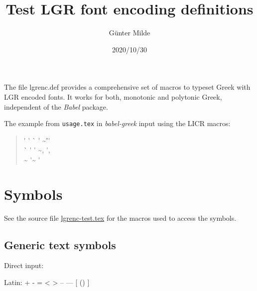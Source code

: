 \documentclass{article}
\newcommand{\LGR}{\fontencoding{LGR}\selectfont}
\begin{document}
\title{Test LGR font encoding definitions}
\author{Günter Milde}
\date{2020/10/30}
\maketitle

The file lgrenc.def provides a comprehensive set of macros to typeset Greek
with LGR encoded fonts. It works for both, monotonic and polytonic Greek,
independent of the \emph{Babel} package.

The example from \texttt{usage.tex} in \emph{babel-greek} input
using the LICR macros:

\begin{quote}
  \LGR
  \textTau\'\textiota{}
  \textphi\'\texteta\textiota\textfinalsigma\texterotimatiko{}
  \<\textIota\textdelta\`\textomega\textnu{}
  \>\textepsilon\textnu\texttheta\'\textepsilon\textdelta\textepsilon{}
  \textpi\textalpha\~\textiota\textdelta\'\'
  \>\textepsilon\textlambda\textepsilon\textupsilon\texttheta\'\textepsilon\textrho\textalpha\textnu\\
  \texttau\`\textalpha\textfinalsigma{}
  \textpi\textlambda\texteta\textautosigma\'\textiota\textomicron\textnu{}
  \textNu\'\textupsilon\textmu\textphi\textalpha\textfinalsigma{}
  \textautosigma\texttau\textepsilon\textphi\textalpha\textnu\textomicron\~\textupsilon\textautosigma\textalpha\textnu{},
  \textSigma\'\textomega\textautosigma\texttau\textrho\textalpha\texttau\textepsilon{},\\
  \>\textepsilon\textrho\~\textomega\textnu{}
  \'\textalpha\textpi\~\texteta\textlambda\texttheta\textepsilon\textfinalsigma{}
  \textepsilon\>\textupsilon\texttheta\'\textupsilon\textfinalsigma\texterotimatiko{}
\end{quote}

\tableofcontents

\section{Symbols}

See the source file \href{lgrenc-test.tex}{lgrenc-test.tex} for the macros
used to access the symbols.

\subsection{Generic text symbols}

Direct input:

Latin:
+ - = < > -- --- [ () ]
\end{document}
